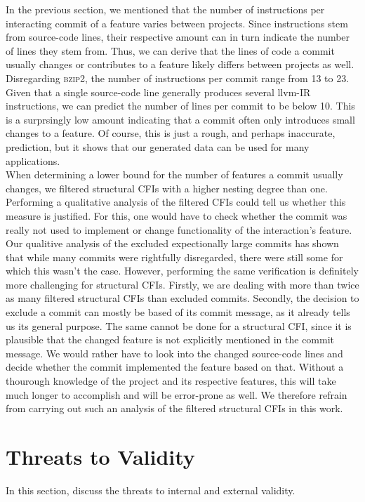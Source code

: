 In the previous section, we mentioned that the number of instructions per interacting commit of a feature varies between projects.
Since instructions stem from source-code lines, their respective amount can in turn indicate the number of lines they stem from.
Thus, we can derive that the lines of code a commit usually changes or contributes to a feature likely differs between projects as well.
Disregarding \textsc{bzip2}, the number of instructions per commit range from 13 to 23.
Given that a single source-code line generally produces several llvm-IR instructions, we can predict the number of lines per commit to be below 10.
This is a surprsingly low amount indicating that a commit often only introduces small changes to a feature.
Of course, this is just a rough, and perhaps inaccurate, prediction, but it shows that our generated data can be used for many applications. \\
When determining a lower bound for the number of features a commit usually changes, we filtered structural CFIs with a higher nesting degree than one.
Performing a qualitative analysis of the filtered CFIs could tell us whether this measure is justified.
For this, one would have to check whether the commit was really not used to implement or change functionality of the interaction's feature.
Our qualitive analysis of the excluded expectionally large commits has shown that while many commits were rightfully disregarded, there were still some for which this wasn't the case.
However, performing the same verification is definitely more challenging for structural CFIs.
Firstly, we are dealing with more than twice as many filtered structural CFIs than excluded commits.
Secondly, the decision to exclude a commit can mostly be based of its commit message, as it already tells us its general purpose.
The same cannot be done for a structural CFI, since it is plausible that the changed feature is not explicitly mentioned in the commit message.
We would rather have to look into the changed source-code lines and decide whether the commit implemented the feature based on that.
Without a thourough knowledge of the project and its respective features, this will take much longer to accomplish and will be error-prone as well.
We therefore refrain from carrying out such an analysis of the filtered structural CFIs in this work. \\

\section{Threats to Validity}\label{sec:threats}

In this section, discuss the threats to internal and external validity.

